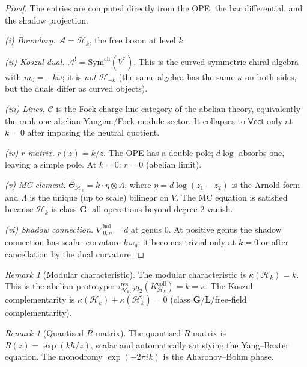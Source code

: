 \documentclass[11pt,reqno]{amsart}
\theoremstyle{definition}
\theoremstyle{remark}
\newtheorem{remark}[theorem]{Remark}
\newcommand{\cA}{\mathcal{A}}
\newcommand{\cC}{\mathcal{C}}
\newcommand{\cH}{\mathcal{H}}
\newcommand{\Sym}{\mathrm{Sym}}
\newcommand{\hol}{\mathrm{hol}}
\numberwithin{equation}{section}
\begin{document}
\begin{proof}
The entries are computed directly from the OPE, the bar differential,
and the shadow projection.

\smallskip\noindent\emph{(i) Boundary.}\enspace
$\cA = \cH_k$, the free boson at level $k$.

\smallskip\noindent\emph{(ii) Koszul dual.}\enspace
$\cA^! = \Sym^{\mathrm{ch}}(V^*)$. This is the
curved symmetric chiral algebra with $m_0 = -k\omega$; it is
\emph{not} $\cH_{-k}$ (the same algebra has the same $\kappa$
on both sides, but the duals differ as curved objects).

\smallskip\noindent\emph{(iii) Lines.}\enspace
\(\cC\) is the Fock-charge line category of the abelian theory,
equivalently the rank-one abelian Yangian/Fock module sector. It
collapses to \(\mathsf{Vect}\) only at \(k=0\) after imposing the
neutral quotient.

\smallskip\noindent\emph{(iv) $r$-matrix.}\enspace
$r(z) = k/z$. The OPE has a double pole; $d\log$ absorbs one,
leaving a simple pole. At $k = 0$: $r = 0$ (abelian limit).

\smallskip\noindent\emph{(v) MC element.}\enspace
$\Theta_{\cH_k} = k \cdot \eta \otimes \Lambda$, where
$\eta = d\log(z_1 - z_2)$ is the Arnold form and $\Lambda$ is the
unique (up to scale) bilinear on $V$. The MC equation is
satisfied because $\cH_k$ is class $\mathbf{G}$: all operations
beyond degree $2$ vanish.

\smallskip\noindent\emph{(vi) Shadow connection.}\enspace
\(\nabla^{\hol}_{0,n}=d\) at genus \(0\). At positive genus the
shadow connection has scalar curvature \(k\,\omega_g\); it becomes
trivial only at \(k=0\) or after cancellation by the dual curvature.
\end{proof}

\begin{remark}[Modular characteristic]\label{rem:heis-kappa}
The modular characteristic is $\kappa(\cH_k) = k$. This is the
abelian prototype:
$\tau_{\cH_k,2}^{\mathrm{res}}q_2(K_{\cH_k}^{\mathrm{coll}})
=k=\kappa$.
The Koszul complementarity is $\kappa(\cH_k) + \kappa(\cH_k^!) = 0$
(class $\mathbf{G}$/$\mathbf{L}$/free-field complementarity).
\end{remark}

\begin{remark}[Quantised $R$-matrix]\label{rem:heis-R}
The quantised $R$-matrix is $R(z) = \exp(k\hbar/z)$, scalar and
automatically satisfying the Yang--Baxter equation. The monodromy
$\exp(-2\pi i k)$ is the Aharonov--Bohm phase.
\end{remark}
\end{document}

